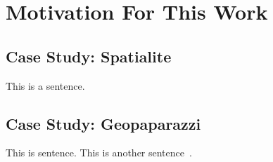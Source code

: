 \chapter{Motivation For This Work}
%
\label{ch:motivation}

\section{Case Study: Spatialite}
This is a sentence.

\section{Case Study: Geopaparazzi}
This is sentence.
This is another sentence~\cite{knuth:tb}.


